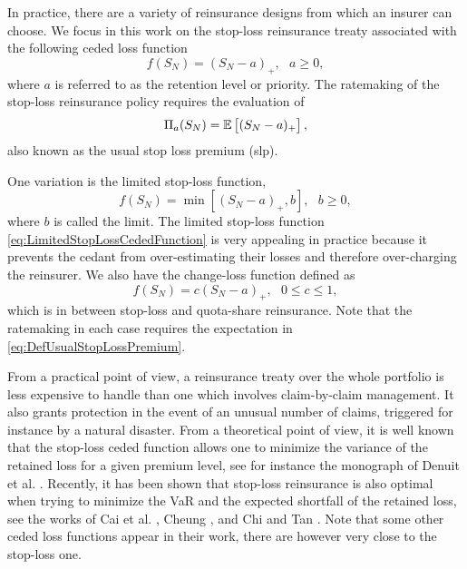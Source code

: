 In practice, there are a variety of reinsurance designs from which an insurer can choose. We focus in this work on the stop-loss reinsurance treaty associated with the following ceded loss function
\begin{equation*}\label{eq:StopLossCededFunction}
f(S_N)=(S_N-a)_{+},\text{ }a\geq0,
\end{equation*}
where $a$ is referred to as the retention level or priority. The ratemaking of the stop-loss reinsurance policy requires the evaluation of
\begin{equation}\label{eq:DefUsualStopLossPremium}
\Pi_{a}(S_N)=\mathbb E\left[(S_N-a)_{+}\right],
\end{equation}
also known as the usual stop loss premium (slp).

One variation is the limited stop-loss function,
\begin{equation}\label{eq:LimitedStopLossCededFunction}
f(S_N)=\min[(S_N-a)_{+},b],\text{ }b\geq0,
\end{equation}
where $b$ is called the limit. The limited stop-loss function \eqref{eq:LimitedStopLossCededFunction} is very appealing in practice because it prevents the cedant from over-estimating their losses and therefore over-charging the reinsurer.
We also have the change-loss function defined as
\begin{equation*}\label{eq:ChangeLossCededFunction}
f(S_N)=c(S_N-a)_{+},\text{ }0\leq c\leq1,
\end{equation*}
which is in between stop-loss and quota-share reinsurance. Note that the ratemaking in each case requires the expectation in \eqref{eq:DefUsualStopLossPremium}.


From a practical point of view, a reinsurance treaty over the whole portfolio is less expensive to handle than one which involves claim-by-claim management. It also grants protection in the event of an unusual number of claims, triggered for instance by a natural disaster. From a theoretical point of view, it is well known that the stop-loss ceded function allows one to minimize the variance of the retained loss for a given premium level, see for instance the monograph of Denuit et al. \cite{DeDhGoKa06}. Recently, it has been shown that stop-loss reinsurance is also optimal when trying to minimize the VaR and the expected shortfall of the retained loss, see the works of Cai et al. \cite{CaTaWeZh08}, Cheung \cite{Ch10}, and Chi and Tan \cite{ChTa11}. Note that some other ceded loss functions appear in their work, there are however very close to the stop-loss one.

